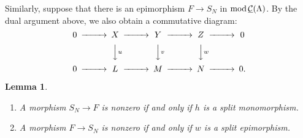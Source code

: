 \documentclass[11pt]{amsart}
\newtheorem{lemma}[theorem]{Lemma}
\theoremstyle{definition}
\numberwithin{equation}{section}
\begin{document}
Similarly, suppose that there is an epimorphism $F \to S_N$ in ${\mathrm{mod}}\,\underline{{\mathcal C}}(\Lambda )$. 
By the dual argument above, we also obtain a commutative diagram:
$$
\begin{CD}
0 @>>>X @>>> Y @>>> Z @>>> 0 \\
@. @VV{u}V @VV{v}V @VV{w}V  @. \\
0 @>>> L @>>> M @>>> N @>>> 0.  
\end{CD}
$$
  


\begin{lemma}\label{B4}
\begin{enumerate}[\rm(1)]
\item A morphism $S_N \to F$ is nonzero if and only if $h$ is a split monomorphism. 

\item A morphism $F \to S_N$ is nonzero if and only if $w$ is a split epimorphism. 
\end{enumerate}
\end{lemma}
\end{document}
